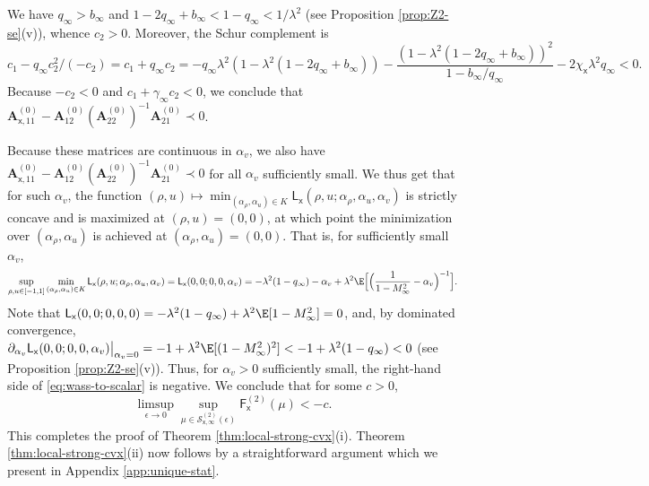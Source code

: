 \documentclass[]{article}
\def\sx{{\mathsf x}}
\def\bA{{\boldsymbol A}}
\def\bA{{\boldsymbol A}}
\def\cS{{\mathcal S}}
\def\cS{{\mathcal S}}
\def\sF{\mathsf{F}}
\def\sL{\mathsf{L}}
\begin{document}
We have $q_\infty > b_\infty$ and $1-2q_\infty + b_\infty < 1 - q_\infty < 1/\lambda^2$ (see Proposition \ref{prop:Z2-se}(v)),
whence $c_2 > 0$.
Moreover, the Schur complement is
\begin{equation}
    c_1 - q_\infty c_2^2/(-c_2) = c_1 + q_\infty c_2 
        = 
        -q_\infty \lambda^2 (1-\lambda^2(1-2q_\infty + b_\infty))
        -\frac{(1-\lambda^2(1-2q_\infty+b_\infty))^2}{1-b_\infty/q_\infty}
        - 2 \chi_{\sx}\lambda^2 q_\infty
        < 0.
\end{equation}
Because $-c_2 < 0$ and $c_1 + \gamma_\infty c_2 < 0$, 
we conclude that $\bA_{\sx,11}^{(0)} - \bA_{12}^{(0)} (\bA_{22}^{(0)})^{-1} \bA_{21}^{(0)} \prec 0$.

Because these matrices are continuous in $\alpha_v$,
we also have $\bA_{\sx,11}^{(0)} - \bA_{12}^{(0)} (\bA_{22}^{(0)})^{-1} \bA_{21}^{(0)} \prec 0$ for all $\alpha_v$ sufficiently small.
We thus get that for such $\alpha_v$,
the function $(\rho,u) \mapsto \min_{(\alpha_\rho,\alpha_u) \in K} \sL_{\sx}(\rho,u;\alpha_\rho,\alpha_u,\alpha_v)$ is strictly concave and is maximized at $(\rho,u) = (0,0)$,
at which point the minimization over $(\alpha_\rho,\alpha_u)$ is achieved at $(\alpha_\rho,\alpha_u) = (0,0)$.
That is,
for sufficiently small $\alpha_v$,
\begin{equation}
    \sup_{\rho,u \in [-1,1]}
    \min_{(\alpha_\rho,\alpha_u) \in K}
        \sL_{\sx}(\rho,u;\alpha_\rho,\alpha_u,\alpha_v)
        =
        \sL_{\sx}(0,0;0,0,\alpha_v)
        =
        -\lambda^2(1-q_\infty)
        -\alpha_v
        +\lambda^2\E\Big[\Big(\frac1{1-M_\infty^2} - \alpha_v\Big)^{-1}\Big].
\end{equation}
Note that $\sL_{\sx}(0,0;0,0,0) = -\lambda^2(1-q_\infty) + \lambda^2\E[1-M_\infty^2] = 0$,
and, by dominated convergence, 
$\partial_{\alpha_v}\sL_{\sx}(0,0;0,0,\alpha_v)\big|_{\alpha_v=0} = - 1 + \lambda^2\E[(1-M_\infty^2)^2] < -1 + \lambda^2(1-q_\infty) < 0$ (see Proposition \ref{prop:Z2-se}(v)). 
Thus, for $\alpha_v > 0$ sufficiently small, the right-hand side of \eqref{eq:wass-to-scalar} is negative.
We conclude that for some $c > 0$,
\begin{equation}
    \limsup_{\epsilon \rightarrow 0}
        \sup_{\mu \in \cS^{(2)}_{\sx,\infty}(\epsilon)} \sF_{\sx}^{(2)}(\mu)
        < -c.
\end{equation}
This completes the proof of Theorem \ref{thm:local-strong-cvx}(i). 
Theorem \ref{thm:local-strong-cvx}(ii) now follows by a straightforward argument which we present in Appendix \ref{app:unique-stat}.
\end{document}

